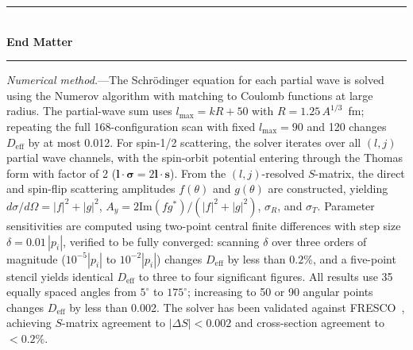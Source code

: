\documentclass[aps,prl,reprint,superscriptaddress,showpacs,floatfix]{revtex4-2}
\begin{document}


\onecolumngrid
\bigskip
\begin{center}
\rule{0.5\columnwidth}{0.5pt}\\[6pt]
{\large\textbf{End Matter}}\\[6pt]
\rule{0.5\columnwidth}{0.5pt}
\end{center}
\twocolumngrid

\textit{Numerical method.}---The Schr\"odinger equation for each partial wave is solved using the Numerov algorithm with matching to Coulomb functions at large radius. The partial-wave sum uses $l_\mathrm{max} = kR + 50$ with $R = 1.25\,A^{1/3}$~fm; repeating the full 168-configuration scan with fixed $l_\mathrm{max} = 90$ and 120 changes $D_\mathrm{eff}$ by at most 0.012. For spin-1/2 scattering, the solver iterates over all $(l, j)$ partial wave channels, with the spin-orbit potential entering through the Thomas form with factor of 2 ($\mathbf{l}\cdot\boldsymbol{\sigma} = 2\mathbf{l}\cdot\mathbf{s}$). From the $(l,j)$-resolved $S$-matrix, the direct and spin-flip scattering amplitudes $f(\theta)$ and $g(\theta)$ are constructed, yielding $d\sigma/d\Omega = |f|^2 + |g|^2$, $A_y = 2\mathrm{Im}(fg^*) / (|f|^2 + |g|^2)$, $\sigma_R$, and $\sigma_T$. Parameter sensitivities are computed using two-point central finite differences with step size $\delta = 0.01\,|p_i|$, verified to be fully converged: scanning $\delta$ over three orders of magnitude ($10^{-5}|p_i|$ to $10^{-2}|p_i|$) changes $D_\mathrm{eff}$ by less than $0.2\%$, and a five-point stencil yields identical $D_\mathrm{eff}$ to three to four significant figures. All results use 35 equally spaced angles from $5^\circ$ to $175^\circ$; increasing to 50 or 90 angular points changes $D_\mathrm{eff}$ by less than 0.002. The solver has been validated against FRESCO~\cite{Thompson1988}, achieving $S$-matrix agreement to $|\Delta S| < 0.002$ and cross-section agreement to $< 0.2\%$.
\end{document}
